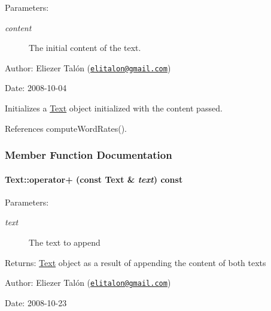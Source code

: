 \begin{Desc}
\item[Parameters:]
\begin{description}
\item[{\em content}]The initial content of the text.\end{description}
\end{Desc}
\begin{Desc}
\item[Author:]Eliezer Talón (\href{mailto:elitalon@gmail.com}{\tt elitalon@gmail.com}) \end{Desc}
\begin{Desc}
\item[Date:]2008-10-04\end{Desc}
Initializes a \hyperlink{class_text}{Text} object initialized with the content passed. 

References computeWordRates().

\subsubsection{Member Function Documentation}
\hypertarget{class_text_c8887fb224e0402448ede4f3b9f7452d}{
\paragraph[operator+]{ Text::operator+ (const {\bf Text} \& {\em text}) const}\hfill}
\label{class_text_c8887fb224e0402448ede4f3b9f7452d}


\begin{Desc}
\item[Parameters:]
\begin{description}
\item[{\em text}]The text to append\end{description}
\end{Desc}
\begin{Desc}
\item[Returns:]\hyperlink{class_text}{Text} object as a result of appending the content of both texts\end{Desc}
\begin{Desc}
\item[Author:]Eliezer Talón (\href{mailto:elitalon@gmail.com}{\tt elitalon@gmail.com}) \end{Desc}
\begin{Desc}
\item[Date:]2008-10-23 \end{Desc}


